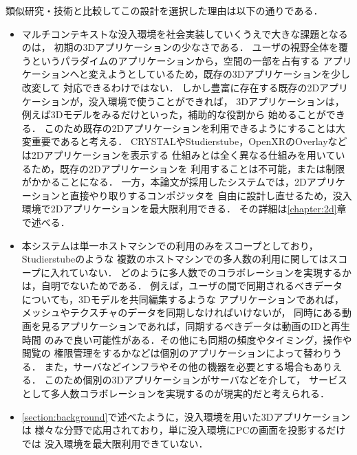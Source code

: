 類似研究・技術と比較してこの設計を選択した理由は以下の通りである．
\begin{itemize}
  \item マルチコンテキストな没入環境を社会実装していくうえで大きな課題となるのは，
        初期の3Dアプリケーションの少なさである．
        ユーザの視野全体を覆うというパラダイムのアプリケーションから，空間の一部を占有する
        アプリケーションへと変えようとしているため，既存の3Dアプリケーションを少し改変して
        対応できるわけではない．
        しかし豊富に存在する既存の2Dアプリケーションが，没入環境で使うことができれば，
        3Dアプリケーションは，例えば3Dモデルをみるだけといった，補助的な役割から
        始めることができる．
        このため既存の2Dアプリケーションを利用できるようにすることは大変重要であると考える．
        CRYSTALやStudierstube，OpenXRのOverlayなどは2Dアプリケーションを表示する
        仕組みとは全く異なる仕組みを用いているため，既存の2Dアプリケーションを
        利用することは不可能，または制限がかかることになる．
        一方，本論文が採用したシステムでは，2Dアプリケーションと直接やり取りするコンポジッタを
        自由に設計し直せるため，没入環境で2Dアプリケーションを最大限利用できる．
        その詳細は\ref{chapter:2d}章で述べる．

  \item 本システムは単一ホストマシンでの利用のみをスコープとしており，Studierstubeのような
        複数のホストマシンでの多人数の利用に関してはスコープに入れていない．
        どのように多人数でのコラボレーションを実現するかは，自明でないためである．
        例えば，ユーザの間で同期されるべきデータについても，3Dモデルを共同編集するような
        アプリケーションであれば，メッシュやテクスチャのデータを同期しなければいけないが，
        同時にある動画を見るアプリケーションであれば，同期するべきデータは動画のIDと再生時間
        のみで良い可能性がある．その他にも同期の頻度やタイミング，操作や閲覧の
        権限管理をするかなどは個別のアプリケーションによって替わりうる．
        また，サーバなどインフラやその他の機器を必要とする場合もありえる．
        このため個別の3Dアプリケーションがサーバなどを介して，
        サービスとして多人数コラボレーションを実現するのが現実的だと考えられる．

  \item \ref{section:background}で述べたように，没入環境を用いた3Dアプリケーションは
        様々な分野で応用されており，単に没入環境にPCの画面を投影するだけでは
        没入環境を最大限利用できていない．
\end{itemize}

